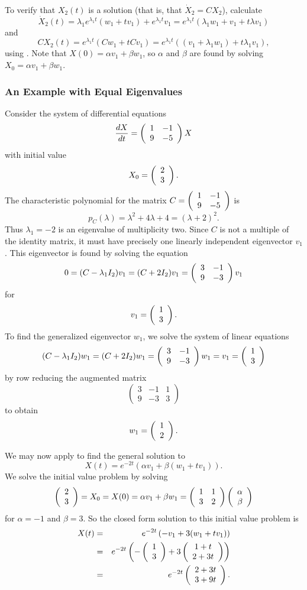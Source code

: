 To verify that $X_2(t)$ is a solution (that is, that $\dot{X}_2=CX_2$),
calculate
\[
\dot{X}_2(t) = \lambda_1 e^{\lambda_1 t}(w_1+tv_1) + e^{\lambda_1 t}v_1=
e^{\lambda_1 t}(\lambda_1 w_1 + v_1 +t\lambda v_1)
\]
and
\[
CX_2(t) = e^{\lambda_1 t}(Cw_1+tCv_1) = e^{\lambda_1 t}
((v_1+\lambda_1 w_1)+t\lambda_1 v_1),
\]
using .  Note that $X(0)=\alpha v_1 + \beta w_1$, so $\alpha$
and $\beta$ are found by solving $X_0= \alpha v_1 + \beta w_1$.

\subsubsection*{An Example with Equal Eigenvalues}

Consider the system of differential equations
\begin{equation}  \label{e:shearexample}
\frac{dX}{dt} = \left(\begin{array}{rr} 1 & -1\\ 9 &-5\end{array}\right) X
\end{equation}
with initial value
\[
X_0 = \left(\begin{array}{r} 2 \\ 3\end{array}\right).
\]
The characteristic polynomial for the matrix $C=\left(\begin{array}{rr} 1 & -1\\ 9 &-5\end{array}\right)$ is
\[
p_C(\lambda) = \lambda^2 + 4\lambda +4 = (\lambda + 2)^2.
\]
Thus $\lambda_1=-2$ is an eigenvalue of multiplicity two.  Since
$C$ is not a multiple of the identity matrix, it must have
precisely one linearly independent eigenvector $v_1$.  This eigenvector is
found by solving the equation
\[
0 = (C-\lambda_1I_2)v_1 = (C+2I_2)v_1 = \left(\begin{array}{rr} 3 & -1\\ 9 &-3\end{array}\right)v_1
\]
for
\[
v_1=\left(\begin{array}{r} 1 \\ 3\end{array}\right).
\]
To find the generalized eigenvector $w_1$, we solve the system of linear
equations
\[
(C-\lambda_1I_2)w_1=(C+2I_2)w_1=\left(\begin{array}{rr} 3 & -1\\ 9 &-3\end{array}\right)w_1= v_1=\left(\begin{array}{r} 1 \\ 3\end{array}\right)
\]
by row reducing the augmented matrix
\[
\left(\begin{array}{rr|r} 3 & -1 & 1\\ 9 & -3 & 3 \end{array}\right)
\]
to obtain
\[
w_1 = \left(\begin{array}{r} 1 \\ 2\end{array}\right).
\]

We may now apply  to find the general solution to
\[
X(t) = e^{-2t}\left(\alpha v_1 +\beta (w_1+tv_1)\right).
\]
We solve the initial value problem by solving
\[
\left(\begin{array}{r} 2 \\ 3\end{array}\right) = X_0 = X(0) = \alpha v_1 +\beta w_1 =
\left(\begin{array}{rr} 1 & 1\\ 3 &2\end{array}\right)\left(\begin{array}{r} \alpha \\ \beta\end{array}\right)
\]
for $\alpha=-1$ and $\beta=3$.   So the closed form solution to this initial
value problem is
\begin{eqnarray*}
X(t) & = & e^{-2t}\left(-v_1 + 3(w_1+tv_1)\right)\\
& = & e^{-2t}\left(-\left(\begin{array}{r} 1 \\ 3\end{array}\right)+3\left(\begin{array}{c} 1+t \\ 2+3t\end{array}\right)\right)\\
& = & e^{-2t}\left(\begin{array}{r} 2+3t \\ 3+9t\end{array}\right).
\end{eqnarray*}

